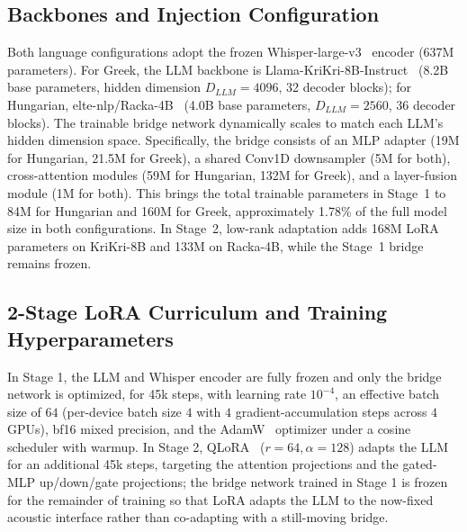 \documentclass{article}
\begin{document}
\subsection{Backbones and Injection Configuration}
\noindent
Both language configurations adopt the frozen Whisper-large-v3~\cite{radford2022robustspeechrecognitionlargescale} encoder (637M parameters). For Greek, the LLM backbone is Llama-KriKri-8B-Instruct~\cite{roussis2025krikriadvancingopenlarge} (8.2B base parameters, hidden dimension $D_{LLM} = 4096$, 32 decoder blocks); for Hungarian, elte-nlp/Racka-4B~\cite{csibi2026rackaefficienthungarianllm} (4.0B base parameters, $D_{LLM} = 2560$, 36 decoder blocks). The trainable bridge network dynamically scales to match each LLM's hidden dimension space. Specifically, the bridge consists of an MLP adapter (19M for Hungarian, 21.5M for Greek), a shared Conv1D downsampler (5M for both), cross-attention modules (59M for Hungarian, 132M for Greek), and a layer-fusion module (1M for both). This brings the total trainable parameters in Stage~1 to 84M for Hungarian and 160M for Greek, approximately 1.78\% of the full model size in both configurations. In Stage~2, low-rank adaptation adds 168M LoRA parameters on KriKri-8B and 133M on Racka-4B, while the Stage~1 bridge remains frozen.

\subsection{2-Stage LoRA Curriculum and Training Hyperparameters}
\noindent
In Stage 1, the LLM and Whisper encoder are fully frozen and only the bridge network is optimized, for 45k steps, with learning rate $10^{-4}$, an effective batch size of $64$ (per-device batch size $4$ with $4$ gradient-accumulation steps across $4$ GPUs), bf16 mixed precision, and the AdamW~\cite{loshchilov2019decoupledweightdecayregularization} optimizer under a cosine scheduler with warmup. In Stage 2, QLoRA~\cite{hu2021loralowrankadaptation, dettmers2023qloraefficientfinetuningquantizedllms} ($r=64, \alpha=128$) adapts the LLM for an additional 45k steps, targeting the attention projections and the gated-MLP up/down/gate projections; the bridge network trained in Stage 1 is frozen for the remainder of training so that LoRA adapts the LLM to the now-fixed acoustic interface rather than co-adapting with a still-moving bridge.
\end{document}
